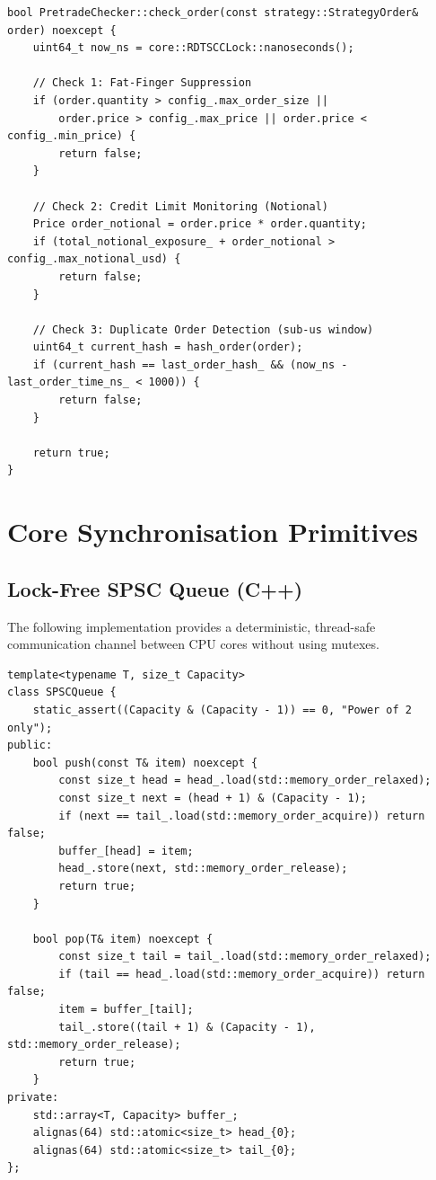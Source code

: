 \begin{lstlisting}[style=cppstyle, caption={Software Pre-Trade Risk Validation}, label={lst:swrisk}]
bool PretradeChecker::check_order(const strategy::StrategyOrder& order) noexcept {
    uint64_t now_ns = core::RDTSCCLock::nanoseconds();

    // Check 1: Fat-Finger Suppression
    if (order.quantity > config_.max_order_size || 
        order.price > config_.max_price || order.price < config_.min_price) {
        return false;
    }

    // Check 2: Credit Limit Monitoring (Notional)
    Price order_notional = order.price * order.quantity;
    if (total_notional_exposure_ + order_notional > config_.max_notional_usd) {
        return false;
    }

    // Check 3: Duplicate Order Detection (sub-us window)
    uint64_t current_hash = hash_order(order);
    if (current_hash == last_order_hash_ && (now_ns - last_order_time_ns_ < 1000)) {
        return false;
    }
    
    return true;
}
\end{lstlisting}

\section{Core Synchronisation Primitives}
\subsection{Lock-Free SPSC Queue (C++)}
The following implementation provides a deterministic, thread-safe communication channel between CPU cores without using mutexes.

\begin{lstlisting}[style=cppstyle, caption={Lock-free SPSC Ring Buffer}, label={lst:spsc}]
template<typename T, size_t Capacity>
class SPSCQueue {
    static_assert((Capacity & (Capacity - 1)) == 0, "Power of 2 only");
public:
    bool push(const T& item) noexcept {
        const size_t head = head_.load(std::memory_order_relaxed);
        const size_t next = (head + 1) & (Capacity - 1);
        if (next == tail_.load(std::memory_order_acquire)) return false;
        buffer_[head] = item;
        head_.store(next, std::memory_order_release);
        return true;
    }

    bool pop(T& item) noexcept {
        const size_t tail = tail_.load(std::memory_order_relaxed);
        if (tail == head_.load(std::memory_order_acquire)) return false;
        item = buffer_[tail];
        tail_.store((tail + 1) & (Capacity - 1), std::memory_order_release);
        return true;
    }
private:
    std::array<T, Capacity> buffer_;
    alignas(64) std::atomic<size_t> head_{0};
    alignas(64) std::atomic<size_t> tail_{0};
};
\end{lstlisting}

